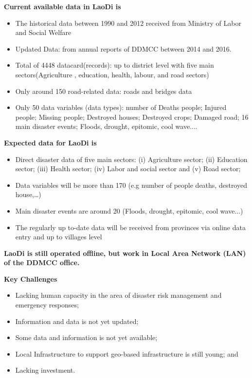 {\flushleft \bfseries Current available data in LaoDi is}
\begin{itemize}
\item The  historical data between 1990 and 2012  received from Ministry of Labor and Social Welfare
\item Updated Data: from annual reports of DDMCC between 2014 and 2016.
\item Total of 4448 datacard(records): up to district level  with five main sectors(Agriculture , education, health, labour, and road sectors)
\item Only around 150 road-related data: roads and bridges  data
\item Only 50 data variables (data types): number  of  Deaths people; Injured people; Missing people; Destroyed houses; Destroyed crops; Damaged road; 16 main disaster events; Floods, drought, epitomic, cool wave....
\end{itemize}

{\flushleft \bfseries Expected data for LaoDi is}
\begin{itemize}
\item Direct disaster data  of five main sectors: (i) Agriculture sector; (ii) Education sector; (iii) Health sector; (iv) Labor and social sector and (v) Road sector;
\item Data variables will be more than 170 (e.g number of people deaths, destroyed house,…)
\item Main disaster events are around 20 (Floods, drought, epitomic, cool wave...)
\item The regularly up to-date data  will be received  from provinces via online data entry   and  up to villages level
\end{itemize}

\textbf{LaoDi is still operated offline, but work in Local Area Network (LAN) of the DDMCC office.}

\vspace{0.4 cm}

{\flushleft \bfseries Key Challenges}
\begin{itemize}
\item Lacking human capacity in the area of disaster risk management and emergency responses;
\item Information and data is not yet updated; 
\item Some data and information is not yet available;
\item Local Infrastructure to support geo-based infrastructure is still young; and 
\item Lacking investment.
\end{itemize}


